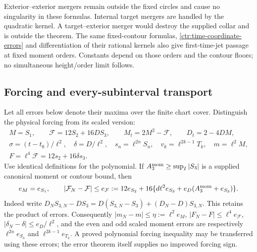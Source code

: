 Exterior--exterior mergers remain outside the fixed circles and cause
no singularity in these formulas. Internal target mergers are handled
by the quadratic kernel. A target--exterior merger would destroy the
supplied collar and is outside the theorem. The same fixed-contour
formulas, \eqref{ctr:time-coordinate-errors} and differentiation of
their rational kernels also give first-time-jet passage at fixed
moment orders. Constants depend on those orders and the contour floors;
no simultaneous height/order limit follows.

\subsection{Forcing and every-subinterval transport}

Let all errors below denote their maxima over the finite chart cover.
Distinguish the physical forcing from its scaled version:
\begin{equation}
 \begin{gathered}
 M=S_1,\qquad \mathcal F=12S_2+16DS_3,\qquad
 M_t=2M^2-\mathcal F,\qquad D_t=2-4DM,\\
 \sigma=(t-t_0)/\ell^2,\quad \delta=D/\ell^2,\quad
 s_n=\ell^{2n}S_n,\quad v_k=\ell^{2k-1}T_k,\quad m=\ell^2M,\\
 F=\ell^4\mathcal F=12s_2+16\delta s_3.
 \end{gathered}
 \label{ctr:physical-normalized}
\end{equation}
Use identical definitions for the polynomial. If
$A_3^{\rm mom}\ge\sup_I|S_3|$ is a supplied canonical moment or
contour bound, then
\begin{equation}
 e_M=e_{S_1},\qquad
 |\mathcal F_N-\mathcal F|\le e_{\mathcal F}:=
 12e_{S_2}+16\{d\ell^2e_{S_3}
                    +e_D(A_3^{\rm mom}+e_{S_3})\}.
 \label{ctr:forcing-error}
\end{equation}
Indeed write $D_NS_{3,N}-DS_3=D(S_{3,N}-S_3)+(D_N-D)S_{3,N}$.
This retains the product of errors. Consequently
$|m_N-m|\le\eta:=\ell^2e_M$, $|F_N-F|\le\ell^4e_{\mathcal F}$,
$|\delta_N-\delta|\le e_D/\ell^2$, and the even and odd scaled
moment errors are respectively $\ell^{2n}e_{S_n}$ and
$\ell^{2k-1}e_{T_k}$. A proved polynomial forcing inequality may be
transferred using these errors; the error theorem itself supplies no
improved forcing sign.


